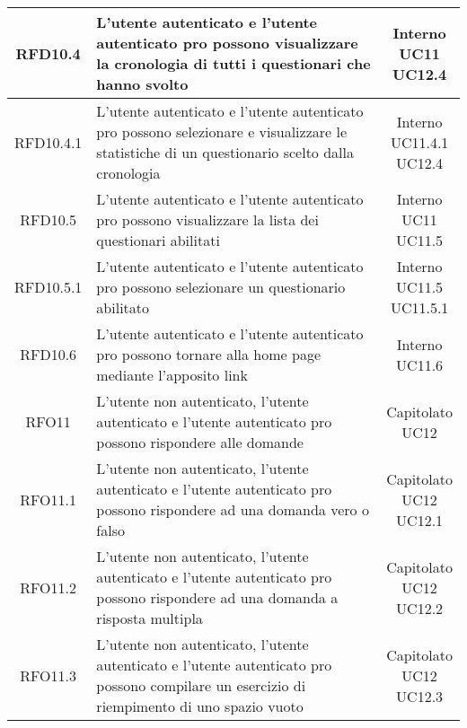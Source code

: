 \begin{longtable}{|c|>{\centering}m{7cm}|c|}
			 \hypertarget{{RFD10.4}}{{RFD10.4}} & L’utente autenticato e l’utente autenticato pro possono visualizzare la cronologia di tutti i questionari che hanno svolto & \makecell{Interno\\ UC11 \\UC12.4 } \\ \hline
			 \hypertarget{{RFD10.4.1}}{{RFD10.4.1}} & L’utente autenticato e l’utente autenticato pro possono selezionare e visualizzare le statistiche di un questionario scelto dalla cronologia & \makecell{Interno\\ UC11.4.1 \\UC12.4 } \\ \hline
			 \hypertarget{{RFD10.5}}{{RFD10.5}} & L’utente autenticato e l’utente autenticato pro possono visualizzare la lista dei questionari abilitati & \makecell{Interno\\ UC11 \\UC11.5 } \\ \hline
			 \hypertarget{{RFD10.5.1}}{{RFD10.5.1}} & L’utente autenticato e l’utente autenticato pro possono selezionare un questionario abilitato & \makecell{Interno\\ UC11.5 \\UC11.5.1 } \\ \hline
			 \hypertarget{{RFD10.6}}{{RFD10.6}} & L’utente autenticato e l’utente autenticato pro possono tornare alla home page mediante l’apposito link  & \makecell{Interno\\ UC11.6 } \\ \hline
			 \hypertarget{{RFO11}}{{RFO11}} & L’utente non autenticato, l'utente autenticato e l’utente autenticato pro possono rispondere alle domande & \makecell{Capitolato\\ UC12 } \\ \hline
			 \hypertarget{{RFO11.1}}{{RFO11.1}} & L’utente non autenticato, l’utente autenticato e l’utente autenticato pro possono rispondere ad una domanda vero o falso & \makecell{Capitolato\\ UC12 \\UC12.1 } \\ \hline
			 \hypertarget{{RFO11.2}}{{RFO11.2}} & L’utente non autenticato, l’utente autenticato e l’utente autenticato pro possono rispondere ad una domanda a risposta multipla & \makecell{Capitolato\\ UC12 \\UC12.2 } \\ \hline
			 \hypertarget{{RFO11.3}}{{RFO11.3}} & L’utente non autenticato, l’utente autenticato e l’utente autenticato pro possono compilare un esercizio di riempimento di uno spazio vuoto & \makecell{Capitolato\\ UC12 \\UC12.3 } \\ \hline

\end{longtable}
